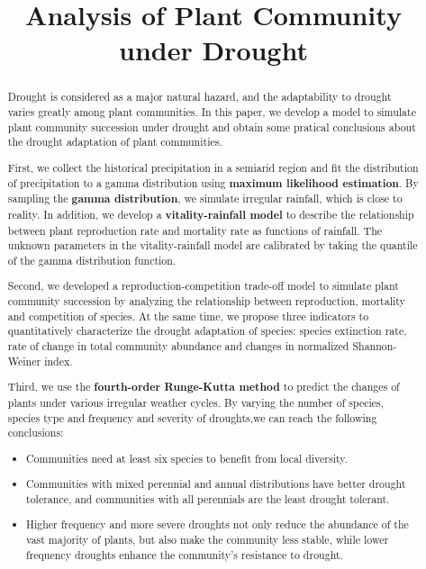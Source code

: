 \documentclass{mcmthesis}
\title{Analysis of Plant Community under Drought}
\date{}
\begin{document}
\begin{abstract}
	
\begin{spacing}{0.97}

Drought  is considered as a major natural hazard, and the adaptability to drought varies greatly among plant communities. In this paper, we develop a model to simulate plant community succession under drought and obtain some pratical conclusions about the drought adaptation of plant communities.

First, we collect the historical precipitation in a semiarid region and fit the distribution of precipitation to a gamma distribution using \textbf{maximum likelihood estimation}. By sampling the \textbf{gamma distribution}, we simulate irregular rainfall, which is close to reality. In addition, we develop a \textbf{vitality-rainfall model} to describe the relationship between plant reproduction rate and mortality rate as functions of rainfall. The unknown parameters in the vitality-rainfall model are calibrated by taking the quantile of the gamma distribution function.

Second, we developed a reproduction-competition trade-off model to simulate plant community succession by analyzing the relationship between reproduction, mortality and competition of species. At the same time, we propose three indicators to quantitatively characterize the drought adaptation of species: species extinction rate, rate of change in total community abundance and changes in normalized Shannon-Weiner index.

Third, we use the \textbf{fourth-order Runge-Kutta method} to predict the changes of plants under various irregular weather cycles. By varying the number of species, species type and frequency and severity of droughts,we can reach the following conclusions:

\begin{itemize}
	\item  Communities need at least six species to benefit from local diversity. 
	\item  Communities with mixed perennial and annual distributions have better drought tolerance, and communities with all perennials are the least drought tolerant.
	\item  Higher frequency and more severe droughts not only reduce the abundance of the vast majority of plants, but also make the community less stable, while lower frequency droughts enhance the community's resistance to drought.
\end{itemize}


\end{spacing}
\end{abstract}
\end{document}
